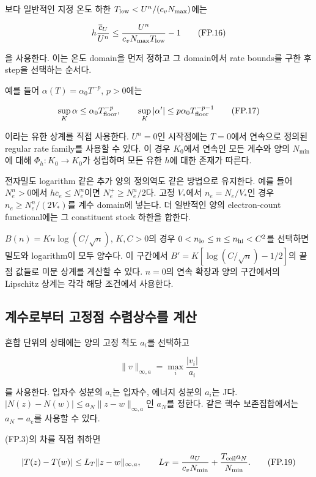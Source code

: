 보다 일반적인 지정 온도 하한 \(T_{\rm low}<U^n/(c_vN_{\max})\)에는

\[
h\frac{\overline c_U}{U^n}
\le
\frac{U^n}{c_vN_{\max}T_{\rm low}}-1
\tag{FP.16}
\]

을 사용한다. 이는 온도 domain을 먼저 정하고 그 domain에서 rate bounds를 구한 후 step을 선택하는 순서다.

예를 들어 \(\alpha(T)=\alpha_0T^{-p}\), \(p>0\)에는

\[
\sup_K\alpha\le\alpha_0T_{\rm floor}^{-p},
\qquad
\sup_K|\alpha'|
\le p\alpha_0T_{\rm floor}^{-p-1}
\tag{FP.17}
\]

이라는 유한 상계를 직접 사용한다. \(U^n=0\)인 시작점에는 \(T=0\)에서 연속으로 정의된 regular rate family를 사용할 수 있다. 이 경우 \(K_0\)에서 연속인 모든 계수와 양의 \(N_{\min}\)에 대해 \(\Phi_h:K_0\to K_0\)가 성립하며 모든 유한 \(h\)에 대한 존재가 따른다.

전자밀도 logarithm 같은 추가 양의 정의역도 같은 방법으로 유지한다. 예를 들어 \(N_e^n>0\)에서 \(h\overline c_e\le N_e^n\)이면 \(N_e^+\ge N_e^n/2\)다. 고정 \(V_*\)에서 \(n_e=N_e/V_*\)인 경우 \(n_e\ge N_e^n/(2V_*)\)를 계수 domain에 넣는다. 더 일반적인 양의 electron-count functional에는 그 constituent stock 하한을 합한다.

\(B(n)=K n\log(C/\sqrt n)\), \(K,C>0\)의 경우 \(0<n_{\rm lo}\le n\le n_{\rm hi}<C^2\)를 선택하면 밀도와 logarithm이 모두 양수다. 이 구간에서 \(B'=K[\log(C/\sqrt n)-1/2]\)의 끝점 값들로 미분 상계를 계산할 수 있다. \(n=0\)의 연속 확장과 양의 구간에서의 Lipschitz 상계는 각각 해당 조건에서 사용한다.

\hypertarget{uxacc4uxc218uxb85cuxbd80uxd130-uxace0uxc815uxc810-uxc218uxb834uxc0c1uxc218uxb97c-uxacc4uxc0b0}{%
\subsection{계수로부터 고정점 수렴상수를 계산}\label{uxacc4uxc218uxb85cuxbd80uxd130-uxace0uxc815uxc810-uxc218uxb834uxc0c1uxc218uxb97c-uxacc4uxc0b0}}

혼합 단위의 상태에는 양의 고정 척도 \(a_i\)를 선택하고

\[
\|v\|_{\infty,a}=\max_i\frac{|v_i|}{a_i}
\tag{FP.18}
\]

를 사용한다. 입자수 성분의 \(a_i\)는 입자수, 에너지 성분의 \(a_i\)는 J다. \(|N(z)-N(w)|\le a_N\|z-w\|_{\infty,a}\)인 \(a_N\)를 정한다. 같은 핵수 보존집합에서는 \(a_N=a_e\)를 사용할 수 있다.

(FP.3)의 차를 직접 취하면

\[
|T(z)-T(w)|
\le L_T\|z-w\|_{\infty,a},\qquad
L_T=\frac{a_U}{c_vN_{\min}}
+\frac{T_{\rm ceil}a_N}{N_{\min}}.
\tag{FP.19}
\]

